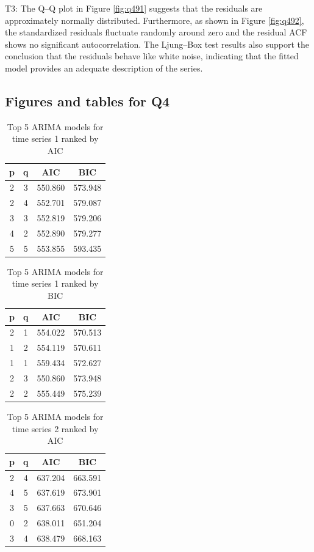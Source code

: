 \documentclass[
]{article}
\theoremstyle{plain}
\theoremstyle{definition}
\theoremstyle{remark}
\begin{document}
T3: The Q--Q plot in Figure \ref{fig:q491} suggests that the residuals are approximately normally distributed. Furthermore, as shown in Figure \ref{fig:q492}, the standardized residuals fluctuate randomly around zero and the residual ACF shows no significant autocorrelation. The Ljung--Box test results also support the conclusion that the residuals behave like white noise, indicating that the fitted model provides an adequate description of the series.

\newpage

\subsection{Figures and tables for Q4}\label{figures-and-tables-for-q4}

\begin{table}[!h]
\centering
\caption{\label{tab:ts1-aicbic}Top 5 ARIMA models for time series 1 ranked by AIC}
\centering
\begin{tabular}[t]{cccc}
\toprule
p & q & AIC & BIC\\
\midrule
2 & 3 & 550.860 & 573.948\\
2 & 4 & 552.701 & 579.087\\
3 & 3 & 552.819 & 579.206\\
4 & 2 & 552.890 & 579.277\\
5 & 5 & 553.855 & 593.435\\
\bottomrule
\end{tabular}
\end{table}

\begin{table}[!h]
\centering
\caption{\label{tab:ts1-aicbic}Top 5 ARIMA models for time series 1 ranked by BIC}
\centering
\begin{tabular}[t]{cccc}
\toprule
p & q & AIC & BIC\\
\midrule
2 & 1 & 554.022 & 570.513\\
1 & 2 & 554.119 & 570.611\\
1 & 1 & 559.434 & 572.627\\
2 & 3 & 550.860 & 573.948\\
2 & 2 & 555.449 & 575.239\\
\bottomrule
\end{tabular}
\end{table}

\begin{table}[!h]
\centering
\caption{\label{tab:ts2-aicbic}Top 5 ARIMA models for time series 2 ranked by AIC}
\centering
\begin{tabular}[t]{cccc}
\toprule
p & q & AIC & BIC\\
\midrule
2 & 4 & 637.204 & 663.591\\
4 & 5 & 637.619 & 673.901\\
3 & 5 & 637.663 & 670.646\\
0 & 2 & 638.011 & 651.204\\
3 & 4 & 638.479 & 668.163\\
\bottomrule
\end{tabular}
\end{table}
\end{document}

